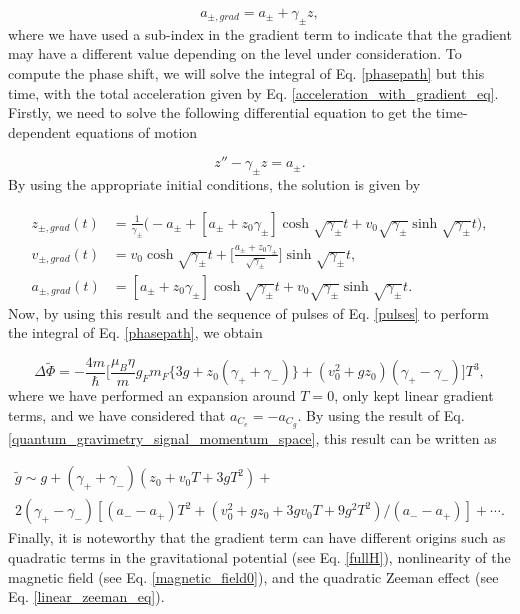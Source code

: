 \documentclass{article}
\begin{document}
\begin{equation}\label{acceleration_with_gradient_eq}
    a_{\pm, grad} = a_{\pm} + \gamma_{\pm} z,
\end{equation}
%
where we have used a sub-index in the gradient term to indicate that the gradient may have a different value depending on the level under consideration. To compute the phase shift, we will solve the integral of Eq. \ref{phasepath} but this time, with the total acceleration given by Eq. \ref{acceleration_with_gradient_eq}. Firstly, we need to solve the following differential equation to get the time-dependent equations of motion

\begin{equation*}
    z'' - \gamma_{\pm} z = a_{\pm}.
\end{equation*}
%
By using the appropriate initial conditions, the solution is given by

\begin{equation}
    \begin{aligned}
    z_{\pm, grad}(t) &= \frac{1}{\gamma_{\pm}} \big( -a_{\pm} + [a_{\pm} + z_0 \gamma_{\pm}] \cosh{\sqrt{\gamma_{\pm}}t} + v_0 \sqrt{\gamma_{\pm}} \sinh{\sqrt{\gamma_{\pm}}t} \big), \\
    v_{\pm, grad}(t) &= v_0 \cosh{\sqrt{\gamma_{\pm}}t} + \bigg[\frac{a_{\pm} + z_0 \gamma_{\pm}}{\sqrt{\gamma_{\pm}}}\bigg] \sinh{\sqrt{\gamma_{\pm}}t}, \\
    a_{\pm, grad} (t) &= [a_{\pm} + z_0 \gamma_{\pm}] \cosh{\sqrt{\gamma_{\pm}}t} + v_0 \sqrt{\gamma_{\pm}} \sinh{\sqrt{\gamma_{\pm}}t}.
    \end{aligned}
\end{equation}
%
Now, by using this result and the sequence of pulses of Eq. \ref{pulses} to perform the integral of Eq. \ref{phasepath}, we obtain

\begin{equation}
    \Delta \tilde{\Phi} = - \frac{4 m}{\hbar} \bigg[ \frac{\mu_{B} \eta}{m} g_{F}m_{F} \{3g + z_0 (\gamma_{+} + \gamma_{-}) \} + (v^{2}_{0} + g z_{0})(\gamma_{+} - \gamma_{-}) \bigg] T^{3},
\end{equation}
%
where we have performed an expansion around $T=0$, only kept linear gradient terms, and we have considered that $a_{C_{e}} = - a_{C_{g}}$. By using the result of Eq. \ref{quantum_gravimetry_signal_momentum_space}, this result can be written as

\begin{multline}
    \tilde{g} \sim g + (\gamma_{+} + \gamma_{-})(z_{0} + v_{0} T + 3 g T^{2})  + \\ 2(\gamma_{+} - \gamma_{-})[(a_{-} - a_{+})T^{2} + (v^{2}_{0} + g z_{0} + 3g v_{0} T + 9 g^{2}T^{2})/(a_{-} - a_{+})] + \cdots.
\end{multline}
%
Finally, it is noteworthy that the gradient term can have different origins such as quadratic terms in the gravitational potential (see Eq. \ref{fullH}), nonlinearity of the magnetic field (see Eq. \ref{magnetic_field0}), and the quadratic Zeeman effect (see Eq. \ref{linear_zeeman_eq}).
\end{document}
